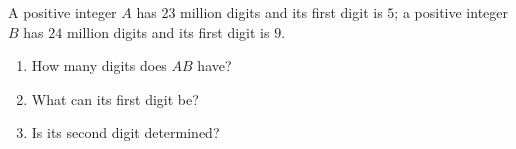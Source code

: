 A positive integer $A$ has $23$ million digits and its first digit is $5$; a positive integer $B$ has $24$ million digits and its first digit is $9$.
\begin{enumerate}
\item How many digits does $AB$ have?
\item What can its first digit be?
\item Is its second digit determined?
\end{enumerate}

